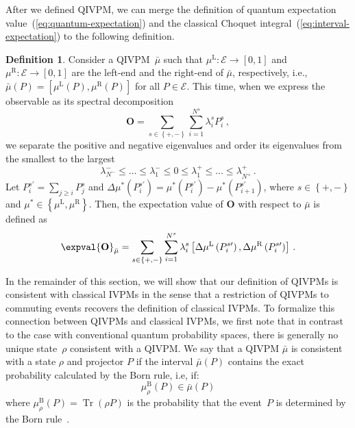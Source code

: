\documentclass[english,reprint, aps, prl,superscriptaddress, showpacs,
showkeys, longbibliography, amsmath, amssymb]{revtex4-1}
\theoremstyle{plain}
\theoremstyle{definition}
\newtheorem{definition}{Definition}
\newcommand{\events}{\ensuremath{\mathcal{E}}}
\newcommand{\Tr}{\ensuremath{\mathop{\mathrm{Tr}}\nolimits}}
\newcommand{\mul}[1][]{\ensuremath{\mu^{\mathrm{L{#1}}}}}
\newcommand{\mur}[1][]{\ensuremath{\mu^{\mathrm{R{#1}}}}}
\begin{document}
After we defined QIVPM, we can merge the definition of quantum expectation
value~(\ref{eq:quantum-expectation}) and the classical Choquet integral~(\ref{eq:interval-expectation})
to the following definition.

\begin{definition}Consider a QIVPM~$\bar{\mu}$ such that $\mul:\events\rightarrow\left[0,1\right]$
and $\mur:\events\rightarrow\left[0,1\right]$ are the left-end and
the right-end of $\bar{\mu}$, respectively, i.e., $\bar{\mu}\left(P\right)=\left[\mul\left(P\right),\mur\left(P\right)\right]$
for all $P\in\events$. This time, when we express the observable
as its spectral decomposition
\begin{equation}
\mathbf{O}=\sum_{s\in\left\{ +,-\right\} }\sum_{i=1}^{N^{s}}\lambda_{i}^{s}P_{i}^{s}\,,\label{eq:spectrum-decomposition}
\end{equation}
we separate the positive and negative eigenvalues and order its eigenvalues
from the smallest to the largest 
\begin{equation}
\lambda_{N^{-}}^{-}\le\ldots\le\lambda_{1}^{-}\le0\le\lambda_{1}^{+}\le\ldots\le\lambda_{N^{+}}^{+}\,.
\end{equation}
Let $P_{i}^{s\prime}=\sum_{j\ge i}P_{j}^{s}$ and $\Delta\mu^{*}\left(P_{i}^{s\prime}\right)=\mu^{*}\left(P_{i}^{s\prime}\right)-\mu^{*}\left(P_{i+1}^{s\prime}\right)$,
where $s\in\left\{ +,-\right\} $ and $\mu^{*}\in\left\{ \mul,\mur\right\} $.
Then, the expectation value of $\mathbf{O}$ with respect to $\bar{\mu}$
is defined as
\begin{equation}
\expval{\mathbf{O}}_{\bar{\mu}}=\sum_{s\in\left\{ +,-\right\} }\sum_{i=1}^{N^{s}}\lambda_{i}^{s}\left[\Delta\mul\left(P_{i}^{s\prime}\right),\Delta\mur\left(P_{i}^{s\prime}\right)\right]\,.\label{eq:quantum-interval-expectation}
\end{equation}
\end{definition}

In the remainder of this section, we will show that our definition of
QIVPMs is consistent with classical IVPMs in the sense that a
restriction of QIVPMs to commuting events recovers the definition of
classical IVPMs. To formalize this connection between QIVPMs and
classical IVPMs, we first note that in contrast to the case with
conventional quantum probability spaces, there is generally no unique
state~$\rho$ consistent with a QIVPM. We say that a QIVPM $\bar{\mu}$
is consistent with a state $\rho$ and projector $P$ if the interval
$\bar{\mu}(P)$ contains the exact probability calculated by the Born
rule, i.e, if:
\begin{equation}
\mu_{\rho}^{\mathrm{B}}\left(P\right)\in\bar{\mu}\left(P\right)
\end{equation}
where $\mu_{\rho}^{\mathrm{B}}\left(P\right)=\Tr\left(\rho P\right)$
is the probability that the event~$P$ is determined by the Born
rule~\citep{Born1983,peres1995quantum,544199}.
\end{document}
